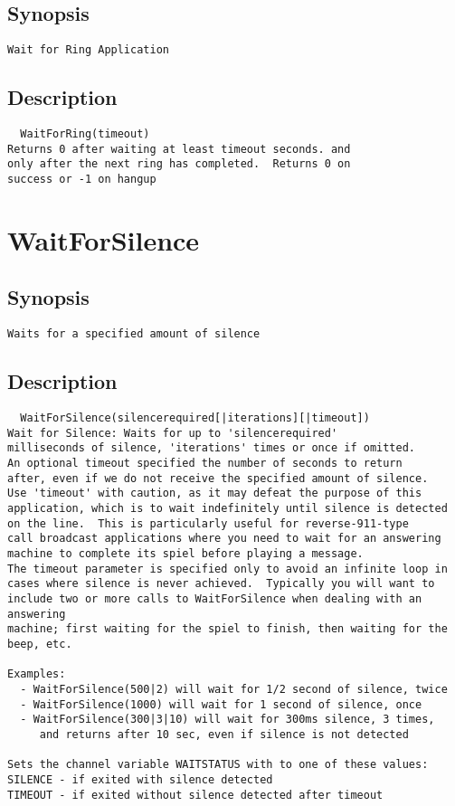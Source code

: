 \subsection{Synopsis}
\begin{verbatim}
Wait for Ring Application
\end{verbatim}
\subsection{Description}
\begin{verbatim}
  WaitForRing(timeout)
Returns 0 after waiting at least timeout seconds. and
only after the next ring has completed.  Returns 0 on
success or -1 on hangup

\end{verbatim}


\section{WaitForSilence}
\subsection{Synopsis}
\begin{verbatim}
Waits for a specified amount of silence
\end{verbatim}
\subsection{Description}
\begin{verbatim}
  WaitForSilence(silencerequired[|iterations][|timeout]) 
Wait for Silence: Waits for up to 'silencerequired' 
milliseconds of silence, 'iterations' times or once if omitted.
An optional timeout specified the number of seconds to return
after, even if we do not receive the specified amount of silence.
Use 'timeout' with caution, as it may defeat the purpose of this
application, which is to wait indefinitely until silence is detected
on the line.  This is particularly useful for reverse-911-type
call broadcast applications where you need to wait for an answering
machine to complete its spiel before playing a message.
The timeout parameter is specified only to avoid an infinite loop in
cases where silence is never achieved.  Typically you will want to
include two or more calls to WaitForSilence when dealing with an answering
machine; first waiting for the spiel to finish, then waiting for the beep, etc.

Examples:
  - WaitForSilence(500|2) will wait for 1/2 second of silence, twice
  - WaitForSilence(1000) will wait for 1 second of silence, once
  - WaitForSilence(300|3|10) will wait for 300ms silence, 3 times,
     and returns after 10 sec, even if silence is not detected

Sets the channel variable WAITSTATUS with to one of these values:
SILENCE - if exited with silence detected
TIMEOUT - if exited without silence detected after timeout

\end{verbatim}


